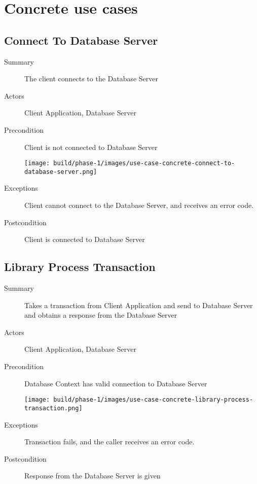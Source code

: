 \documentclass[a4paper]{report}
\begin{document}
	\pagebreak
	
\section{Concrete use cases}

	\subsection{Connect To Database Server}

	\begin{description}
		\item[Summary] The client connects to the Database Server
		\item[Actors] Client Application, Database Server
		\item[Precondition] Client is not connected to Database Server

		\begin{center}
			\texttt{[image: build/phase-1/images/use-case-concrete-connect-to-database-server.png]}
		\end{center}

		\item[Exceptions] Client cannot connect to the Database Server, and receives an error code.
		\item[Postcondition] Client is connected to Database Server
	\end{description}

	\pagebreak
	
	\subsection{Library Process Transaction}

	\begin{description}
		\item[Summary] Takes a transaction from Client Application and send to Database Server and obtains a response from the Database Server
		\item[Actors] Client Application, Database Server
		\item[Precondition] Database Context has valid connection to Database Server

		\begin{center}
			\texttt{[image: build/phase-1/images/use-case-concrete-library-process-transaction.png]}
		\end{center}

		\item[Exceptions] Transaction fails, and the caller receives an error code.
		\item[Postcondition] Response from the Database Server is given
	\end{description}
	
\end{document}

